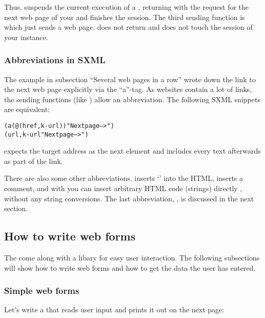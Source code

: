 Thus,  suspends the current execution of a
\surflet, returning with the request for the next web page of your
\surflet and  finishes the session.  The third
sending function is  which just sends a web page.
 does not return and does not touch the session of
your \surflet instance.

\subsubsection{Abbreviations in SXML}
\label{sxml-abbrvs}

The example in subsection ``Several web pages in a row'' wrote down
the link to the next web page explicitly via the ``a''-tag.  As
websites contain a lot of links, the sending functions (like
) allow an abbreviation.  The following SXML
snippets are equivalent:

\begin{alltt}
(a (@ (href ,k-url)) "Next page -->")
(url ,k-url "Next page -->")
\end{alltt}

 expects the target address as the next element and includes
every text afterwards as part of the link. 

There are also some other abbreviations.   inserts
`' into the HTML,  inserts a
comment, and with  you can insert arbitrary
HTML code (\ie strings) directly , without any string conversions.
The last abbreviation, , is discussed in the next
section.


\subsection{How to write web forms}

The \surflets come along with a libary for easy user interaction.  The
following subsections will show how to write web forms and how to get
the data the user has entered.


\subsubsection{Simple web forms}

Let's write a \surflet that reads user input and prints it out on the
next page:

